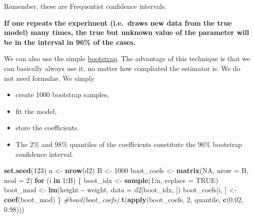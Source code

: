 \documentclass[
]{book}
\newenvironment{Shaded}{\begin{snugshade}}{\end{snugshade}}
\newcommand{\AttributeTok}[1]{\textcolor[rgb]{0.13,0.29,0.53}{#1}}
\newcommand{\CommentTok}[1]{\textcolor[rgb]{0.56,0.35,0.01}{\textit{#1}}}
\newcommand{\ConstantTok}[1]{\textcolor[rgb]{0.56,0.35,0.01}{#1}}
\newcommand{\ControlFlowTok}[1]{\textcolor[rgb]{0.13,0.29,0.53}{\textbf{#1}}}
\newcommand{\DecValTok}[1]{\textcolor[rgb]{0.00,0.00,0.81}{#1}}
\newcommand{\FloatTok}[1]{\textcolor[rgb]{0.00,0.00,0.81}{#1}}
\newcommand{\FunctionTok}[1]{\textcolor[rgb]{0.13,0.29,0.53}{\textbf{#1}}}
\newcommand{\NormalTok}[1]{#1}
\newcommand{\OtherTok}[1]{\textcolor[rgb]{0.56,0.35,0.01}{#1}}
\newcommand{\SpecialCharTok}[1]{\textcolor[rgb]{0.81,0.36,0.00}{\textbf{#1}}}
\providecommand{\tightlist}{%
  \setlength{\itemsep}{0pt}\setlength{\parskip}{0pt}}
\begin{document}
Remember, these are Frequentist confidence intervals.

\textbf{If one repeats the experiment (i.e.~draws new data from the true model)
many times, the true but unknown value of the parameter will
be in the interval in 96\% of the cases.}

We can also use the simple \href{https://en.wikipedia.org/wiki/Bootstrapping_(statistics)}{bootstrap}.
The advantage of this technique is that we can basically always use it,
no matter how compliated the estimator is. We do not need formulae.
We simply

\begin{itemize}
\tightlist
\item
  create 1000 bootstrap samples,
\item
  fit the model,
\item
  store the coefficients.
\item
  The 2\% and 98\% quantiles of the coefficients constitute the 96\% bootstrap confidence interval.
\end{itemize}

\begin{Shaded}
\begin{Highlighting}[]
\FunctionTok{set.seed}\NormalTok{(}\DecValTok{123}\NormalTok{)}
\NormalTok{n }\OtherTok{\textless{}{-}} \FunctionTok{nrow}\NormalTok{(d2)}
\NormalTok{B }\OtherTok{\textless{}{-}} \DecValTok{1000}
\NormalTok{boot\_coefs }\OtherTok{\textless{}{-}} \FunctionTok{matrix}\NormalTok{(}\ConstantTok{NA}\NormalTok{, }\AttributeTok{nrow =}\NormalTok{ B, }\AttributeTok{ncol =} \DecValTok{2}\NormalTok{)}
\ControlFlowTok{for}\NormalTok{ (i }\ControlFlowTok{in} \DecValTok{1}\SpecialCharTok{:}\NormalTok{B) \{}
\NormalTok{  boot\_idx }\OtherTok{\textless{}{-}} \FunctionTok{sample}\NormalTok{(}\DecValTok{1}\SpecialCharTok{:}\NormalTok{n, }\AttributeTok{replace =} \ConstantTok{TRUE}\NormalTok{)}
\NormalTok{  boot\_mod }\OtherTok{\textless{}{-}} \FunctionTok{lm}\NormalTok{(height }\SpecialCharTok{\textasciitilde{}}\NormalTok{ weight, }\AttributeTok{data =}\NormalTok{ d2[boot\_idx, ])}
\NormalTok{  boot\_coefs[i, ] }\OtherTok{\textless{}{-}} \FunctionTok{coef}\NormalTok{(boot\_mod)}
\NormalTok{\}}
\CommentTok{\#head(boot\_coefs)}
\FunctionTok{t}\NormalTok{(}\FunctionTok{apply}\NormalTok{(boot\_coefs, }\DecValTok{2}\NormalTok{, quantile, }\FunctionTok{c}\NormalTok{(}\FloatTok{0.02}\NormalTok{, }\FloatTok{0.98}\NormalTok{)))}
\end{Highlighting}
\end{Shaded}
\end{document}
